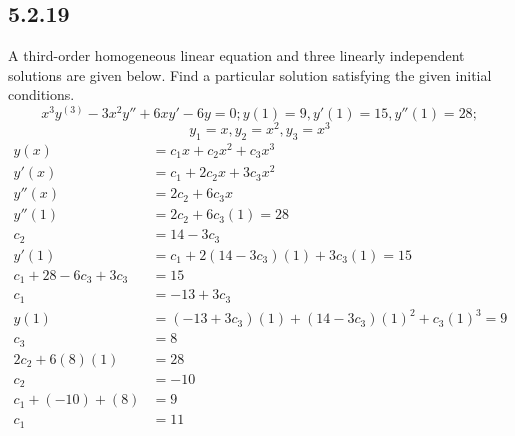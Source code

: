 \documentclass{article}
\begin{document}
\subsection{5.2.19}
A third-order homogeneous linear equation and three linearly independent solutions are given below. Find a particular solution satisfying the given initial conditions.
$$ x^3y^{(3)} - 3x^2y'' + 6xy' - 6y = 0; y(1) = 9, y'(1) = 15, y''(1) = 28; $$
$$ y_1 = x, y_2 = x^2, y_3 = x^3 $$
\begin{align*}
	y(x) & = c_1x + c_2x^2 + c_3x^3 \\
	y'(x) & = c_1 + 2c_2x + 3c_3x^2 \\
	y''(x) & = 2c_2 + 6c_3x \\
	y''(1) & = 2c_2 + 6c_3(1) = 28 \\
	c_2 & = 14 - 3c_3 \\
	y'(1) & = c_1 + 2(14 - 3c_3)(1) + 3c_3(1) = 15 \\
	c_1 + 28 - 6c_3 + 3c_3 & = 15 \\
	c_1 & = -13 + 3c_3 \\
	y(1) & = (-13 + 3c_3)(1) + (14 - 3c_3)(1)^2 + c_3(1)^3 = 9 \\
	c_3 & = 8 \\
	2c_2 + 6(8)(1) & = 28 \\
	c_2 & = -10 \\
	c_1 + (-10) + (8) & = 9 \\
	c_1 & = 11
\end{align*}
\end{document}
